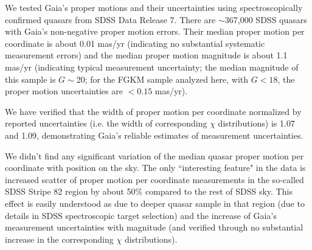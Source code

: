 \vskip 0.1in

We tested Gaia's proper motions and their uncertainties using
spectroscopically confirmed quasars from SDSS Data Release 7. There
are $\sim$367,000 SDSS quasars with Gaia's non-negative proper motion errors.
Their median  proper motion per
coordinate is about 0.01 mas/yr (indicating no substantial systematic
measurement errors) and the median proper motion magnitude
is about 1.1 mas/yr (indicating typical measurement uncertainty; the
median magnitude of this sample is $G\sim$20; for the FGKM sample
analyzed here, with $G<18$, the proper motion uncertainties are
$<0.15$ mas/yr). 

We have verified that the width of  proper motion per
coordinate normalized by reported uncertainties (i.e. the width of corresponding
$\chi$ distributions) is 1.07 and 1.09, demonstrating Gaia's reliable
estimates of measurement uncertainties.

We didn't find any significant variation of the median quasar proper motion per
coordinate with position on the sky. The only ``interesting feature"
in the data is increased scatter of proper motion per
coordinate measurements in the so-called SDSS Stripe 82 region by
about 50\% compared to the rest of SDSS sky. This effect is easily understood as due to deeper quasar
sample in that region (due to details in SDSS spectroscopic target
selection) and the increase of Gaia's measurement uncertainties with
magnitude (and verified through no substantial increase in the
corresponding $\chi$ distributions). 






